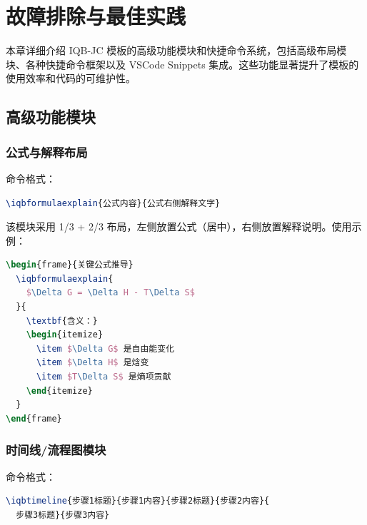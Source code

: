 
\chapter{故障排除与最佳实践}
\label{chap:8}

本章详细介绍 IQB-JC 模板的高级功能模块和快捷命令系统，包括高级布局模块、各种快捷命令框架以及 VSCode Snippets 集成。这些功能显著提升了模板的使用效率和代码的可维护性。

\section{高级功能模块}

\subsection{公式与解释布局}

命令格式：

\begin{lstlisting}[style=blockstyle,language=TeX]
\iqbformulaexplain{公式内容}{公式右侧解释文字}
\end{lstlisting}

该模块采用 1/3 + 2/3 布局，左侧放置公式（居中），右侧放置解释说明。使用示例：

\begin{lstlisting}[style=blockstyle,language=TeX]
\begin{frame}{关键公式推导}
  \iqbformulaexplain{
    $\Delta G = \Delta H - T\Delta S$
  }{
    \textbf{含义：}
    \begin{itemize}
      \item $\Delta G$ 是自由能变化
      \item $\Delta H$ 是焓变
      \item $T\Delta S$ 是熵项贡献
    \end{itemize}
  }
\end{frame}
\end{lstlisting}

\subsection{时间线/流程图模块}

命令格式：

\begin{lstlisting}[style=blockstyle,language=TeX]
\iqbtimeline{步骤1标题}{步骤1内容}{步骤2标题}{步骤2内容}{
  步骤3标题}{步骤3内容}
\end{lstlisting}

